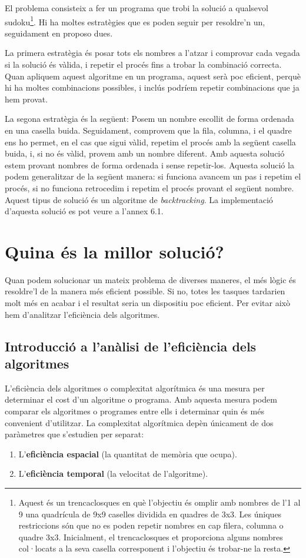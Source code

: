 El problema consisteix a fer un programa que trobi la solució a qualsevol sudoku\footnote{Aquest és un trencaclosques en què l'objectiu és omplir amb nombres de l'1 al 9 una quadrícula de 9x9 caselles dividida en quadres de 3x3. Les úniques restriccions són que no es poden repetir nombres en cap filera, columna o quadre 3x3. Inicialment, el trencaclosques et proporciona alguns nombres col·locats a la seva casella corresponent i l'objectiu és trobar-ne la resta.}. Hi ha moltes estratègies que es poden seguir per resoldre'n un, seguidament en proposo dues. 

La primera estratègia és posar tots els nombres a l'atzar i comprovar cada vegada si la solució és vàlida, i repetir el procés fins a trobar la combinació correcta. Quan apliquem aquest algoritme en un programa, aquest serà poc eficient, perquè hi ha moltes combinacions possibles, i inclús podríem repetir combinacions que ja hem provat.

La segona estratègia és la següent: Posem un nombre escollit de forma ordenada en una casella buida. Seguidament, comprovem que la fila, columna, i el quadre ens ho permet, en el cas que sigui vàlid, repetim el procés amb la següent casella buida, i, si no és vàlid, provem amb un nombre diferent. Amb aquesta solució estem provant nombres de forma ordenada i sense repetir-los. Aquesta solució la podem generalitzar de la següent manera: si funciona avancem un pas i repetim el procés, si no funciona retrocedim i repetim el procés provant el següent nombre. Aquest tipus de solució és un algoritme de \textit{backtracking}. La implementació d'aquesta solució es pot veure a l'annex 6.1.

\section{Quina és la millor solució?}
Quan podem solucionar un mateix problema de diverses maneres, el més lògic és resoldre'l de la manera més eficient possible. Si no, totes les tasques tardarien molt més en acabar i el resultat seria un dispositiu poc eficient. Per evitar això hem d'analitzar l'eficiència dels algoritmes.

\subsection{Introducció a l'anàlisi de l'eficiència dels algoritmes}%
L'eficiència dels algoritmes o complexitat algorítmica és una mesura per determinar el cost d'un algoritme o programa. Amb aquesta mesura podem comparar els algoritmes o programes entre ells i determinar quin és més convenient d'utilitzar. La complexitat algorítmica depèn únicament de dos paràmetres que s'estudien per separat:
\begin{enumerate}
    \item L'\textbf{eficiència espacial} (la quantitat de memòria que ocupa).
    \item L'\textbf{eficiència temporal} (la velocitat de l'algoritme).
\end{enumerate}

